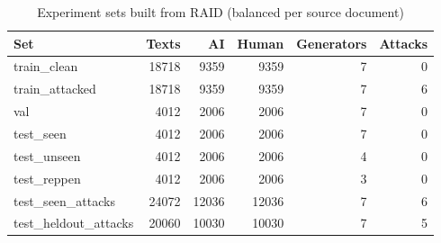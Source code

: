 \begin{table}[!t]
\centering
\caption{Experiment sets built from RAID (balanced per source document)}
\label{tab:split_sizes}
\footnotesize
\begin{tabular}{lrrrrr}
\toprule
\textbf{Set} & \textbf{Texts} & \textbf{AI} & \textbf{Human} & \textbf{Generators} & \textbf{Attacks} \\
\midrule
train\_clean & 18718 & 9359 & 9359 & 7 & 0 \\
train\_attacked & 18718 & 9359 & 9359 & 7 & 6 \\
val & 4012 & 2006 & 2006 & 7 & 0 \\
test\_seen & 4012 & 2006 & 2006 & 7 & 0 \\
test\_unseen & 4012 & 2006 & 2006 & 4 & 0 \\
test\_reppen & 4012 & 2006 & 2006 & 3 & 0 \\
test\_seen\_attacks & 24072 & 12036 & 12036 & 7 & 6 \\
test\_heldout\_attacks & 20060 & 10030 & 10030 & 7 & 5 \\
\bottomrule
\end{tabular}
\end{table}
